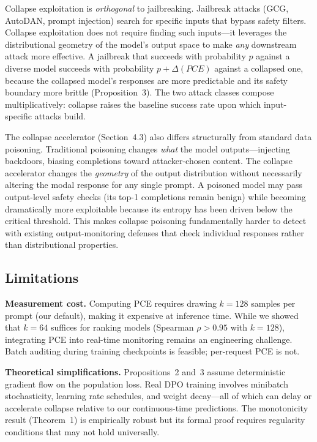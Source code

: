 Collapse exploitation is \emph{orthogonal} to jailbreaking. Jailbreak attacks (GCG, AutoDAN, prompt injection) search for specific inputs that bypass safety filters. Collapse exploitation does not require finding such inputs---it leverages the distributional geometry of the model's output space to make \emph{any} downstream attack more effective. A jailbreak that succeeds with probability $p$ against a diverse model succeeds with probability $p + \Delta(PCE)$ against a collapsed one, because the collapsed model's responses are more predictable and its safety boundary more brittle (Proposition~3). The two attack classes compose multiplicatively: collapse raises the baseline success rate upon which input-specific attacks build.

The collapse accelerator (Section~4.3) also differs structurally from standard data poisoning. Traditional poisoning changes \emph{what} the model outputs---injecting backdoors, biasing completions toward attacker-chosen content. The collapse accelerator changes the \emph{geometry} of the output distribution without necessarily altering the modal response for any single prompt. A poisoned model may pass output-level safety checks (its top-1 completions remain benign) while becoming dramatically more exploitable because its entropy has been driven below the critical threshold. This makes collapse poisoning fundamentally harder to detect with existing output-monitoring defenses that check individual responses rather than distributional properties.

\subsection{Limitations}

\textbf{Measurement cost.} Computing PCE requires drawing $k=128$ samples per prompt (our default), making it expensive at inference time. While we showed that $k=64$ suffices for ranking models (Spearman $\rho > 0.95$ with $k=128$), integrating PCE into real-time monitoring remains an engineering challenge. Batch auditing during training checkpoints is feasible; per-request PCE is not.

\textbf{Theoretical simplifications.} Propositions~2 and~3 assume deterministic gradient flow on the population loss. Real DPO training involves minibatch stochasticity, learning rate schedules, and weight decay---all of which can delay or accelerate collapse relative to our continuous-time predictions. The monotonicity result (Theorem~1) is empirically robust but its formal proof requires regularity conditions that may not hold universally.

